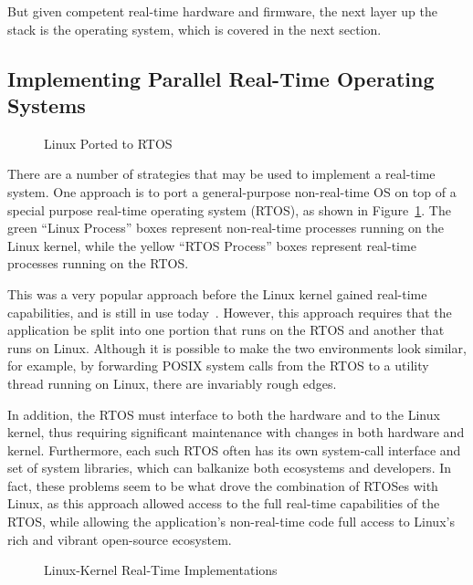 But given competent real-time hardware and firmware, the next
layer up the stack is the operating system, which is covered in
the next section.

\subsection{Implementing Parallel Real-Time Operating Systems}
\label{sec:rt:Implementing Parallel Real-Time Operating Systems}

\begin{figure}[tb]
\centering
{}
\caption{Linux Ported to RTOS}
\label{fig:rt:Linux Ported to RTOS}
\end{figure}

There are a number of strategies that may be used to implement a
real-time system.
One approach is to port a general-purpose non-real-time OS on top
of a special purpose real-time operating system (RTOS), as shown in
Figure~\ref{fig:rt:Linux Ported to RTOS}.
The green ``Linux Process'' boxes represent non-real-time processes
running on the Linux kernel, while the yellow ``RTOS Process''
boxes represent real-time processes running on the RTOS.

This was a very popular approach before the Linux kernel gained
real-time capabilities, and is still in use
today~\cite{Xenomai2014,VictorYodaiken2004a}.
However, this approach requires that the application be split into
one portion that runs on the RTOS and another that runs on Linux.
Although it is possible to make the two environments look similar,
for example, by forwarding POSIX system calls from the RTOS to a
utility thread running on Linux, there are invariably rough edges.

In addition, the RTOS must interface to both the hardware and to
the Linux kernel, thus requiring significant maintenance with
changes in both hardware and kernel.
Furthermore, each such RTOS often has its own system-call interface
and set of system libraries, which can balkanize both ecosystems and
developers.
In fact, these problems seem to be what drove the combination of
RTOSes with Linux, as this approach allowed access to the full real-time
capabilities of the RTOS, while allowing the application's non-real-time
code full access to Linux's rich and vibrant open-source ecosystem.

\begin{figure}[p]
\centering
{}
\caption{Linux-Kernel Real-Time Implementations}
\label{fig:rt:Linux-Kernel Real-Time Implementations}
\end{figure}

